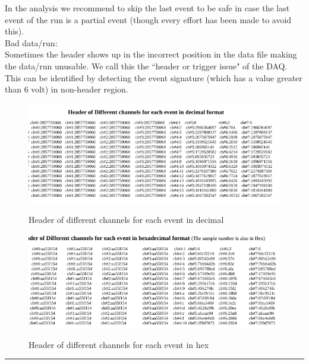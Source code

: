 \documentclass[12pt]{article}
\begin{document}
In the analysis we recommend to skip the last event to be safe in case the last event of the run is a partial event (though every effort has been made to avoid this). \\

\noindent
Bad data/run:\\
Sometimes the header shows up in the incorrect position in the data file making the data/run unusable. We call this the ``header or trigger issue" of the DAQ. This can be identified by detecting the event signature (which has a value greater than 6 volt) in non-header region.   

     
\newpage     
\begin{figure}[htb]
\centering
\includegraphics[width=6in]{header1.png}\\
\caption{Header of different channels for each event in decimal}\label{f1}
\end{figure}

\begin{figure}[htb]
\centering
\includegraphics[width=6in]{header2.png}\\
\caption{Header of different channels for each event in hex}\label{f1}
\end{figure}

\noindent
{\color{red} \rule{\linewidth}{1mm} }
 
\newpage
\end{document}
